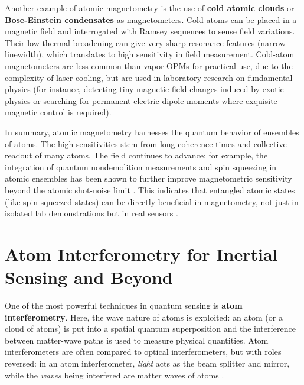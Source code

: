 Another example of atomic magnetometry is the use of \textbf{cold
  atomic clouds} or \textbf{Bose-Einstein condensates} as
magnetometers. Cold atoms can be placed in a magnetic field and
interrogated with Ramsey sequences to sense field variations. Their
low thermal broadening can give very sharp resonance features (narrow
linewidth), which translates to high sensitivity in field
measurement. Cold-atom magnetometers are less common than vapor OPMs
for practical use, due to the complexity of laser cooling, but are
used in laboratory research on fundamental physics (for instance,
detecting tiny magnetic field changes induced by exotic physics or
searching for permanent electric dipole moments where exquisite
magnetic control is required).



In summary, atomic magnetometry harnesses the quantum behavior of
ensembles of atoms. The high sensitivities stem from long coherence
times and collective readout of many atoms. The field continues to
advance; for example, the integration of quantum nondemolition
measurements and spin squeezing in atomic ensembles has been shown to
further improve magnetometric sensitivity beyond the atomic shot-noise
limit . This indicates that entangled atomic states (like
spin-squeezed states) can be directly beneficial in magnetometry, not
just in isolated lab demonstrations but in real sensors .



\section{Atom Interferometry for Inertial Sensing and Beyond}\label{sec:atom-interf}

One of the most powerful techniques in quantum sensing is \textbf{atom
  interferometry}. Here, the wave nature of atoms is exploited: an
atom (or a cloud of atoms) is put into a spatial quantum superposition
and the interference between matter-wave paths is used to measure
physical quantities. Atom interferometers are often compared to
optical interferometers, but with roles reversed: in an atom
interferometer, \emph{light} acts as the beam splitter and mirror,
while the \emph{waves} being interfered are matter waves of atoms .



